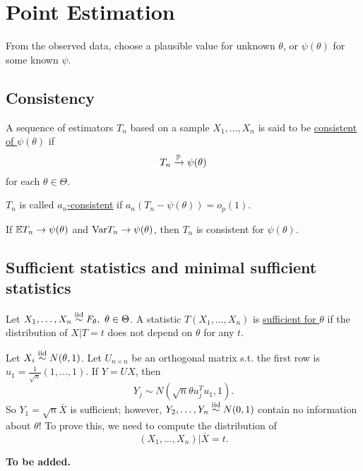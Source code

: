 \section{Point Estimation}
\begin{problem}
	From the observed data, choose a plausible value for unknown $\theta$, or $\psi(\theta)$ for some known $\psi$.
\end{problem}

\begin{comment}
\begin{tabular}{ c | l  }
			  	\hline
			  	\textbf{Notations} & \textbf{Descriptions} \\ 
			  	\hline
			  	$\mu$& $=\mathbb{E}(X)$\\
			  	$\Sigma$& $=\mathrm{Var}(X)$\\
			  	$\sigma_{YX}$& $=\mathbb{E}[Y(X-\mu)]$\\
			  	\hline 
\end{tabular}

\end{comment}
\subsection{Consistency}
\begin{mydef}
	A sequence of estimators $T_n$ based on a sample $X_1,\dots,X_n$ is said to be \uline{consistent of $\psi(\theta)$} if
	$$T_n \xrightarrow{\mathbb{P}} \psi(\theta)$$
	for each $\theta \in \Theta$.
	
	$T_n$ is called \uline{$a_n$-consistent} if $a_n (T_n - \psi(\theta)) = o_p(1)$. 
\end{mydef}

\begin{prop}
	If $\mathbb{E} T_n \to \psi(\theta)$ and $\mathrm{Var} T_n \to \psi(\theta)$, then $T_n$ is consistent for $\psi(\theta)$.
\end{prop}

\subsection{Sufficient statistics and minimal sufficient statistics}
\begin{mydef}
	Let $X_1,\dots,X_n \SimIID F_\theta, \ \theta\in \Theta$. A statistic $T(X_1, \dots, X_n)$ is \underline{sufficient for $\theta$} if the distribution of $X|T=t$ does not depend on $\theta$ for any $t$.
\end{mydef}
\begin{exap} 
	Let $X_i \stackrel{\text{iid}}{\sim} N(\theta,1)$. Let $U_{n \times n}$ be an orthogonal matrix s.t. the first row is $u_1 = \frac{1}{\sqrt{n}}(1, \dots, 1)$. If $Y = UX$, then 
	$$Y_j \sim N( \sqrt{n}\theta u^T_j u_1, 1 ).$$ 
	So $Y_1 = \sqrt{n} \bar{X}$ is sufficient; however, $Y_2,\dots, Y_n \stackrel{\text{iid}}{\sim} N(0,1)$ contain no information about $\theta$! To prove this, we need to compute the distribution of 
	$$(X_1, \dots, X_n)|\bar{X}=t.$$
	
	\textbf{To be added.}
\end{exap}
 
